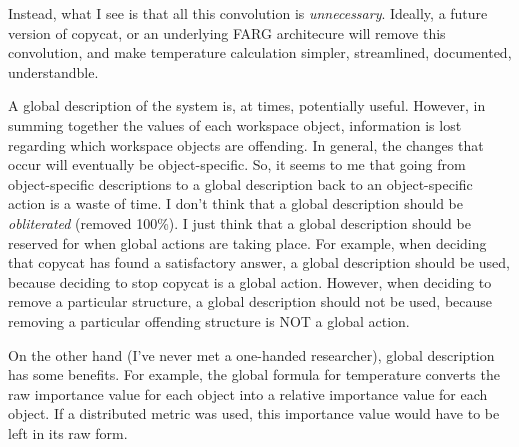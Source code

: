 \documentclass[a4paper]{article}
\begin{document}


    Instead, what I see is that all this convolution is \emph{unnecessary}.
    Ideally, a future version of copycat, or an underlying FARG architecure will remove this convolution, and make temperature calculation simpler, streamlined, documented, understandble.

    A global description of the system is, at times, potentially useful.
    However, in summing together the values of each workspace object, information is lost regarding which workspace objects are offending.
    In general, the changes that occur will eventually be object-specific.
    So, it seems to me that going from object-specific descriptions to a global description back to an object-specific action is a waste of time.
    I don't think that a global description should be \emph{obliterated} (removed 100\%).
    I just think that a global description should be reserved for when global actions are taking place.
    For example, when deciding that copycat has found a satisfactory answer, a global description should be used, because deciding to stop copycat is a global action.
    However, when deciding to remove a particular structure, a global description should not be used, because removing a particular offending structure is NOT a global action.

    On the other hand (I've never met a one-handed researcher), global description has some benefits.
    For example, the global formula for temperature converts the raw importance value for each object into a relative importance value for each object.
    If a distributed metric was used, this importance value would have to be left in its raw form.
\end{document}
